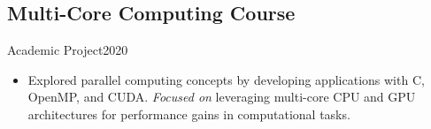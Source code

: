 \subsection{Multi-Core Computing Course}{Academic Project}{2020}
\begin{itemize}
    \item Explored parallel computing concepts by developing applications with C, OpenMP, and CUDA. \emph{Focused on} leveraging multi-core CPU and GPU architectures for performance gains in computational tasks.
\end{itemize}
